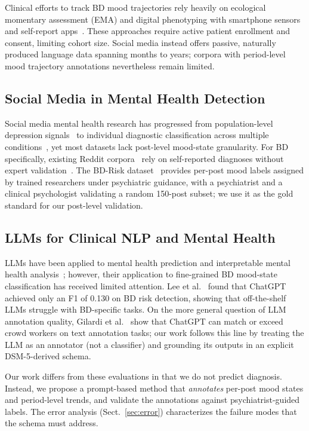 \documentclass[runningheads]{llncs}
\begin{document}
Clinical efforts to track BD mood trajectories rely heavily on ecological momentary assessment (EMA) and digital phenotyping with smartphone sensors and self-report apps~\cite{faurholt2018smartphone}. These approaches require active patient enrollment and consent, limiting cohort size. Social media instead offers passive, naturally produced language data spanning months to years; corpora with period-level mood trajectory annotations nevertheless remain limited.

\subsection{Social Media in Mental Health Detection}

Social media mental health research has progressed from population-level depression signals~\cite{dechoudhury2013predicting} to individual diagnostic classification across multiple conditions~\cite{cohan2018smhd,coppersmith2015clpsych}, yet most datasets lack post-level mood-state granularity. For BD specifically, existing Reddit corpora~\cite{jagfeld2021understanding,sekulic2018not} rely on self-reported diagnoses without expert validation~\cite{harrigian2021state}. The BD-Risk dataset~\cite{lee2024detecting} provides per-post mood labels assigned by trained researchers under psychiatric guidance, with a psychiatrist and a clinical psychologist validating a random 150-post subset; we use it as the gold standard for our post-level validation.

\subsection{LLMs for Clinical NLP and Mental Health}

 LLMs have been applied to mental health prediction and interpretable mental health analysis~\cite{xu2024mental,yang2024mentallama}; however, their application to fine-grained BD mood-state classification has received limited attention. Lee et al.~\cite{lee2024detecting} found that ChatGPT achieved only an F1 of 0.130 on BD risk detection, showing that off-the-shelf LLMs struggle with BD-specific tasks. On the more general question of LLM annotation quality, Gilardi et al.~\cite{gilardi2023chatgpt} show that ChatGPT can match or exceed crowd workers on text annotation tasks; our work follows this line by treating the LLM as an annotator (not a classifier) and grounding its outputs in an explicit DSM-5-derived schema.

Our work differs from these evaluations in that we do not predict diagnosis. Instead, we propose a prompt-based method that \emph{annotates} per-post mood states and period-level trends, and validate the annotations against psychiatrist-guided labels. The error analysis (Sect.~\ref{sec:error}) characterizes the failure modes that the schema must address.
\end{document}
